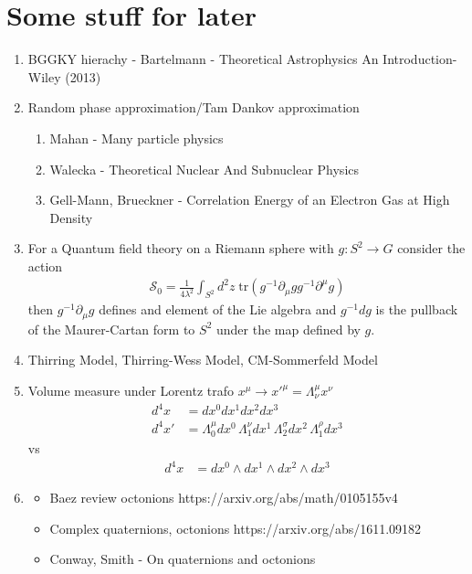 \documentclass[10pt,a4paper]{book}
\theoremstyle{definition}
\begin{document}
\newpage 
\chapter{Some stuff for later}
\begin{enumerate}
\item BGGKY hierachy - Bartelmann - Theoretical Astrophysics An Introduction-Wiley (2013)
\item Random phase approximation/Tam Dankov approximation
\begin{enumerate}
\item Mahan - Many particle physics
\item Walecka - Theoretical Nuclear And Subnuclear Physics
\item Gell-Mann, Brueckner - Correlation Energy of an Electron Gas at High Density
\end{enumerate} 


\item For a Quantum field theory on a Riemann sphere with $g:S^2\rightarrow G$ consider the action 
    \begin{align}
        \mathcal{S}_0=\frac{1}{4\lambda^2}\int_{S^2}d^2z\;\text{tr}(g^{-1}\partial_\mu g g^{-1}\partial^\mu g)
    \end{align}
    then $g^{-1}\partial_\mu g$ defines and element of the Lie algebra and $g^{-1}dg$ is the pullback of the Maurer-Cartan form to $S^2$ under the map defined by $g$.
\item Thirring Model, Thirring-Wess Model, CM-Sommerfeld Model
\item Volume measure under Lorentz trafo $x^\mu\rightarrow x'^\mu=\Lambda^\mu_\nu x^\nu$
    \begin{align}
        d^4x
        &=dx^0dx^1dx^2dx^3\\
        d^4x'&=\Lambda^\mu_0dx^0\,\Lambda^\nu_1dx^1\,\Lambda^\sigma_2dx^2\,\Lambda^\rho_1dx^3
    \end{align}
    vs
    \begin{align}
        d^4x
        &=dx^0\wedge dx^1\wedge dx^2\wedge dx^3
    \end{align}
\item 
    \begin{itemize}
        \item Baez review octonions {\sc https://arxiv.org/abs/math/0105155v4}
        \item Complex quaternions, octonions {\sc https://arxiv.org/abs/1611.09182}
        \item Conway, Smith - On quaternions and octonions
    \end{itemize}
\end{enumerate}
\end{document}
